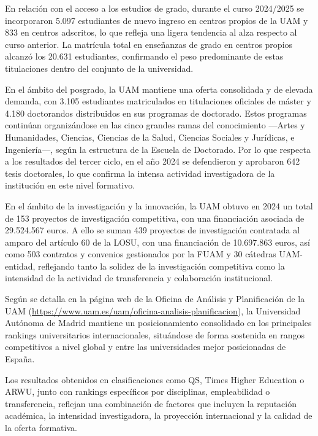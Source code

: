 \documentclass[
  11pt,
  a4paper,
  twoside]{scrreprt}
\begin{document}
En relación con el acceso a los estudios de grado, durante el curso
2024/2025 se incorporaron 5.097 estudiantes de nuevo ingreso en centros
propios de la UAM y 833 en centros adscritos, lo que refleja una ligera
tendencia al alza respecto al curso anterior. La matrícula total en
enseñanzas de grado en centros propios alcanzó los 20.631 estudiantes,
confirmando el peso predominante de estas titulaciones dentro del
conjunto de la universidad.

En el ámbito del posgrado, la UAM mantiene una oferta consolidada y de
elevada demanda, con 3.105 estudiantes matriculados en titulaciones
oficiales de máster y 4.180 doctorandos distribuidos en sus programas de
doctorado. Estos programas continúan organizándose en las cinco grandes
ramas del conocimiento ---Artes y Humanidades, Ciencias, Ciencias de la
Salud, Ciencias Sociales y Jurídicas, e Ingeniería---, según la
estructura de la Escuela de Doctorado. Por lo que respecta a los
resultados del tercer ciclo, en el año 2024 se defendieron y aprobaron
642 tesis doctorales, lo que confirma la intensa actividad investigadora
de la institución en este nivel formativo.

En el ámbito de la investigación y la innovación, la UAM obtuvo en 2024
un total de 153 proyectos de investigación competitiva, con una
financiación asociada de 29.524.567 euros. A ello se suman 439 proyectos
de investigación contratada al amparo del artículo 60 de la LOSU, con
una financiación de 10.697.863 euros, así como 503 contratos y convenios
gestionados por la FUAM y 30 cátedras UAM-entidad, reflejando tanto la
solidez de la investigación competitiva como la intensidad de la
actividad de transferencia y colaboración institucional.

Según se detalla en la página web de la Oficina de Análisis y
Planificación de la UAM
(\url{https://www.uam.es/uam/oficina-analisis-planificacion}), la
Universidad Autónoma de Madrid mantiene un posicionamiento consolidado
en los principales rankings universitarios internacionales, situándose
de forma sostenida en rangos competitivos a nivel global y entre las
universidades mejor posicionadas de España.

Los resultados obtenidos en clasificaciones como QS, Times Higher
Education o ARWU, junto con rankings específicos por disciplinas,
empleabilidad o transferencia, reflejan una combinación de factores que
incluyen la reputación académica, la intensidad investigadora, la
proyección internacional y la calidad de la oferta formativa.
\end{document}
